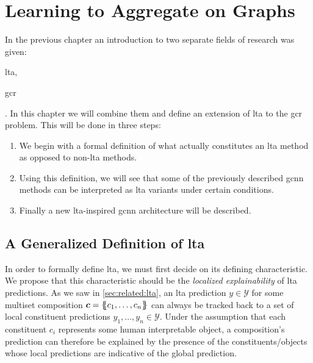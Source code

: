 \chapter{Learning to Aggregate on Graphs}%
\label{sec:ltag}

In the previous chapter an introduction to two separate fields of research was given:
\begin{enumerate*}
	\item \Acf{lta},
	\item \Acf{gcr}
\end{enumerate*}.
In this chapter we will combine them and define an extension of \ac{lta} to the \ac{gcr} problem.
This will be done in three steps:
\begin{enumerate}
	\item We begin with a formal definition of what actually constitutes an \ac{lta} method as opposed to non-\acs{lta} methods.
	\item Using this definition, we will see that some of the previously described \ac{gcnn} methods can be interpreted as \ac{lta} variants under certain conditions.
	\item Finally a new \acs{lta}-inspired \ac{gcnn} architecture will be described.
\end{enumerate}

\section{A Generalized Definition of \acs*{lta}}%
\label{sec:ltag:definition}

In order to formally define \ac{lta}, we must first decide on its defining characteristic.
We propose that this characteristic should be the \textit{localized explainability} of \ac{lta} predictions.
As we saw in \cref{sec:related:lta}, an \ac{lta} prediction $y \in \mathcal{Y}$ for some multiset composition $\bm{c} = \ldblbrace c_1, \dots, c_n \rdblbrace$ can always be tracked back to a set of local constituent predictions $y_1, \dots, y_n \in \mathcal{Y}$.
Under the assumption that each constituent $c_i$ represents some human interpretable object, a composition's prediction can therefore be explained by the presence of the constituents/objects whose local predictions are indicative of the global prediction.

